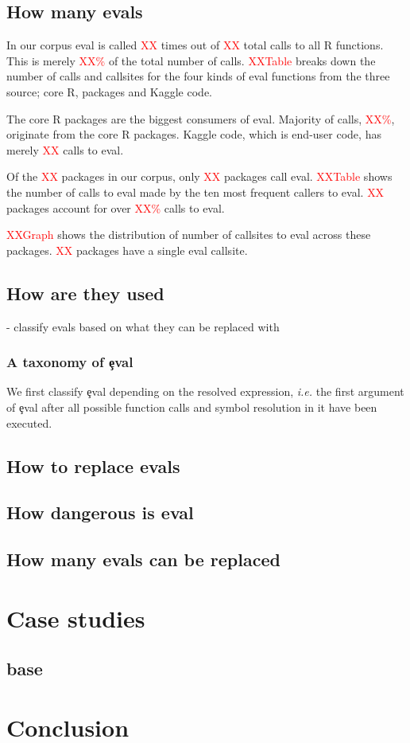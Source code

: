 \documentclass[conference]{IEEEtran}
\newcommand{\missingNumber}{\textcolor{red}{XX}\xspace}
\newcommand{\missingPercentage}{\textcolor{red}{XX\%}\xspace}
\newcommand{\missingTable}{\textcolor{red}{XXTable}\xspace}
\newcommand{\missingGraph}{\textcolor{red}{XXGraph}\xspace}
\begin{document}
\subsection{How many evals}

In our corpus eval is called \missingNumber times out of \missingNumber
total calls to all R functions. This is merely \missingPercentage of the total
number of calls. \missingTable breaks down the number of calls and callsites for
the four kinds of eval functions from the three source; core R, packages and
Kaggle code.

The core R packages are the biggest consumers of eval. Majority of calls,
\missingPercentage, originate from the core R packages. Kaggle code, which is
end-user code, has merely \missingNumber calls to eval.

Of the \missingNumber packages in our corpus, only \missingNumber packages call
eval. \missingTable shows the number of calls to eval made by the ten most
frequent callers to eval. \missingNumber packages account for over
\missingPercentage calls to eval.

\missingGraph shows the distribution of number of callsites to eval across these
packages. \missingNumber packages have a single eval callsite.


\subsection{How are they used}

- classify evals based on what they can be replaced with

\subsubsection{A taxonomy of \c{eval}}

We first classify \c{eval} depending on the resolved expression, \emph{i.e.}
the first argument of \c{eval} after all possible function calls and symbol
resolution in it have been executed.



\subsection{How to replace evals}


\subsection{How dangerous is eval}

\subsection{How many evals can be replaced}

\section{Case studies}

\subsection{base}


\section{Conclusion}



\end{document}
